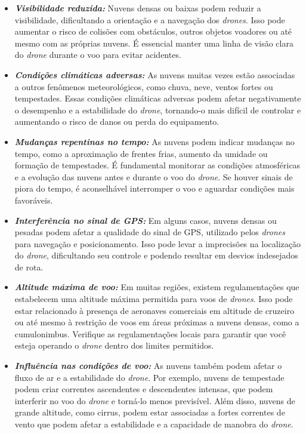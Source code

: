 \documentclass[a4paper, 12pt, onecolumn,singlespacing]{article}
\begin{document}
	\begin{itemize}
		\item \textbf{\textit{Visibilidade reduzida:}} Nuvens densas ou baixas podem reduzir a visibilidade, dificultando a orientação e a navegação dos \textit{drones}. Isso pode aumentar o risco de colisões com obstáculos, outros objetos voadores ou até mesmo com as próprias nuvens. É essencial manter uma linha de visão clara do \textit{drone} durante o voo para evitar acidentes.
		
		\item \textbf{\textit{Condições climáticas adversas:}} As nuvens muitas vezes estão associadas a outros fenômenos meteorológicos, como chuva, neve, ventos fortes ou tempestades. Essas condições climáticas adversas podem afetar negativamente o desempenho e a estabilidade do \textit{drone}, tornando-o mais difícil de controlar e aumentando o risco de danos ou perda do equipamento.
		
		\item \textbf{\textit{Mudanças repentinas no tempo:}} As nuvens podem indicar mudanças no tempo, como a aproximação de frentes frias, aumento da umidade ou formação de tempestades. É fundamental monitorar as condições atmosféricas e a evolução das nuvens antes e durante o voo do \textit{drone}. Se houver sinais de piora do tempo, é aconselhável interromper o voo e aguardar condições mais favoráveis.
		
		\item \textbf{\textit{Interferência no sinal de GPS:}} Em alguns casos, nuvens densas ou pesadas podem afetar a qualidade do sinal de GPS, utilizado pelos \textit{drones} para navegação e posicionamento. Isso pode levar a imprecisões na localização do \textit{drone}, dificultando seu controle e podendo resultar em desvios indesejados de rota.
		
		\item  \textbf{\textit{Altitude máxima de voo:}} Em muitas regiões, existem regulamentações que estabelecem uma altitude máxima permitida para voos de \textit{drones}. Isso pode estar relacionado à presença de aeronaves comerciais em altitude de cruzeiro ou até mesmo à restrição de voos em áreas próximas a nuvens densas, como a cumulonimbus. Verifique as regulamentações locais para garantir que você esteja operando o \textit{drone} dentro dos limites permitidos.
		
		\item \textbf{\textit{Influência nas condições de voo:}} As nuvens também podem afetar o fluxo de ar e a estabilidade do \textit{drone}. Por exemplo, nuvens de tempestade podem criar correntes ascendentes e descendentes intensas, que podem interferir no voo do \textit{drone} e torná-lo menos previsível. Além disso, nuvens de grande altitude, como cirrus, podem estar associadas a fortes correntes de vento que podem afetar a estabilidade e a capacidade de manobra do \textit{drone}.
		
	\end{itemize}
	
\end{document}
